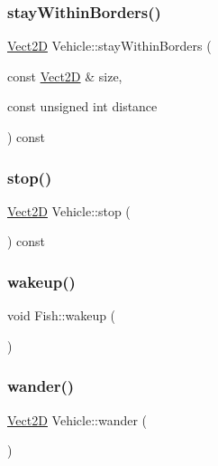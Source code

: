 \subsubsection{\texorpdfstring{stay\+Within\+Borders()}{stayWithinBorders()}}
{\footnotesize\ttfamily \hyperlink{classVect2D}{Vect2D} Vehicle\+::stay\+Within\+Borders (\begin{DoxyParamCaption}\item[{const \hyperlink{classVect2D}{Vect2D} \&}]{size,  }\item[{const unsigned int}]{distance }\end{DoxyParamCaption}) const\hspace{0.3cm}{\ttfamily [inherited]}}

\mbox{\label{classVehicle_a9a1cb1e5dab4a474fbe0c1c49482d0ee_a9a1cb1e5dab4a474fbe0c1c49482d0ee}} 
\subsubsection{\texorpdfstring{stop()}{stop()}}
{\footnotesize\ttfamily \hyperlink{classVect2D}{Vect2D} Vehicle\+::stop (\begin{DoxyParamCaption}{ }\end{DoxyParamCaption}) const\hspace{0.3cm}{\ttfamily [inherited]}}

\mbox{\label{classFish_a8160593a43c6ce5263c6280e0cf0a7be_a8160593a43c6ce5263c6280e0cf0a7be}} 
\subsubsection{\texorpdfstring{wakeup()}{wakeup()}}
{\footnotesize\ttfamily void Fish\+::wakeup (\begin{DoxyParamCaption}{ }\end{DoxyParamCaption})}

\mbox{\label{classVehicle_af9da94116706c94e5f26df42c258dc6e_af9da94116706c94e5f26df42c258dc6e}} 
\subsubsection{\texorpdfstring{wander()}{wander()}}
{\footnotesize\ttfamily \hyperlink{classVect2D}{Vect2D} Vehicle\+::wander (\begin{DoxyParamCaption}{ }\end{DoxyParamCaption})\hspace{0.3cm}{\ttfamily [inherited]}}



